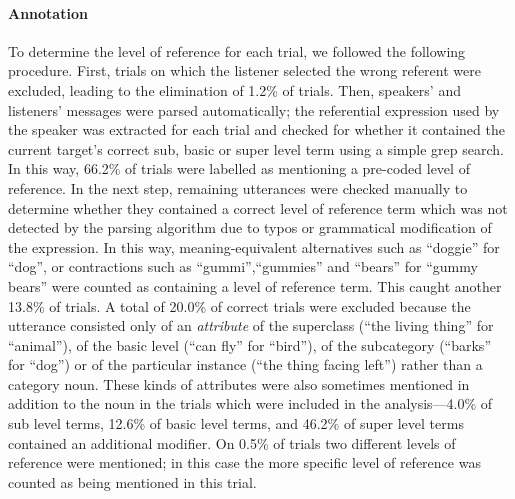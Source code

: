 \documentclass[10pt,letterpaper]{article}
\newcommand{\jd}[1]{\textcolor{Blue}{[jd: #1]}}
\begin{document}
\paragraph{Annotation}
To determine the level of reference for each trial, we followed the following procedure. First, trials on which the listener selected the wrong referent were excluded, leading to the elimination of 1.2\% of trials. Then, speakers' and listeners' messages were parsed automatically; the referential expression used by the speaker was extracted for each trial and checked for whether it contained the current target's correct sub, basic or super level term using a simple grep search. In this way, 66.2\% of trials were labelled as mentioning a pre-coded level of reference. In the next step, remaining utterances were checked manually to determine whether they contained a correct level of reference term which was not detected by the parsing algorithm due to typos or grammatical modification of the expression. In this way, meaning-equivalent alternatives such as ``doggie'' for ``dog'',  or contractions such as ``gummi'',``gummies'' and ``bears'' for ``gummy bears'' were counted as containing a level of reference term. This caught another 13.8\% of trials. A total of 20.0\% of correct trials were excluded because the utterance consisted only of an \emph{attribute} of the superclass (``the living thing'' for ``animal''), of the basic level (``can fly'' for ``bird''), of the subcategory (``barks'' for ``dog'') or of the  particular instance (``the thing facing left'') rather than a category noun. These kinds of attributes were also sometimes mentioned in addition to the noun in the trials which were included in the analysis---4.0\% of sub level terms, 12.6\% of basic level terms, and 46.2\% of super level terms contained an additional modifier. 
On 0.5\% of trials two different levels of reference were mentioned; in this case the more specific level of reference was counted as being mentioned in this trial. 
\end{document}
